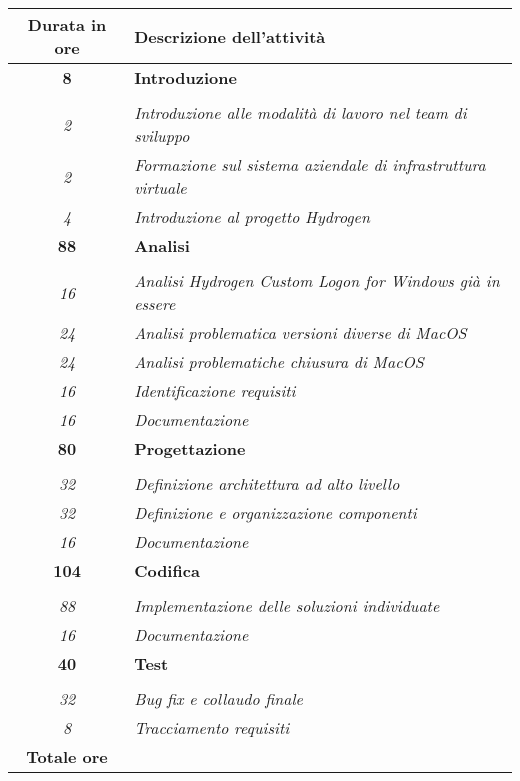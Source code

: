 

\begin{tabularx}{\textwidth}{|c|X|}
	\hline
	\textbf{Durata in ore} & \textbf{Descrizione dell'attività} \\\hline
	
	\textbf{8} & \textbf{Introduzione} \\ \hdashline
    \multirow{3}{0cm}\\
    \textit{2} & 
    \textit{Introduzione alle modalità di lavoro nel team di sviluppo} \\
    \textit{2} & 
    \textit{Formazione sul sistema aziendale di infrastruttura virtuale} \\
    \textit{4} &
    \textit{Introduzione al progetto Hydrogen} \\
    \hline
    
    \textbf{88} & \textbf{Analisi} \\ \hdashline 
    \multirow{3}{0cm}\\ 
    \textit{16} & 
    \textit{Analisi Hydrogen Custom Logon for Windows già in essere} \\
    \textit{24} & 
    \textit{Analisi problematica versioni diverse di MacOS} \\
    \textit{24} & 
    \textit{Analisi problematiche chiusura di MacOS} \\
    \textit{16} & 
    \textit{Identificazione requisiti} \\
    \textit{16} & 
    \textit{Documentazione} \\
    \hline
    
    \textbf{80} & \textbf{Progettazione}  \\ \hdashline 
    \multirow{4}{0cm}\\ 
    \textit{32} & 
    \textit{Definizione architettura ad alto livello} \\
    \textit{32} & 
    \textit{Definizione e organizzazione componenti} \\
    \textit{16} & 
    \textit{Documentazione} \\
    \hline
    
    \textbf{104} & \textbf{Codifica}  \\ \hdashline 
    \multirow{4}{0cm}\\ 
    \textit{88} & 
    \textit{Implementazione delle soluzioni individuate} \\
    \textit{16} & 
    \textit{Documentazione} \\
    \hline
	
	\textbf{40} & \textbf{Test}  \\ \hdashline 
	\multirow{4}{0cm}\\ 
	\textit{32} & 
	\textit{Bug fix e collaudo finale} \\
	\textit{8} & 
	\textit{Tracciamento requisiti} \\
	\hline
	
	\textbf{Totale ore} & \multicolumn{1}{|c|}{\textbf{\totaleOre}} \\\hline
	
	
\end{tabularx}